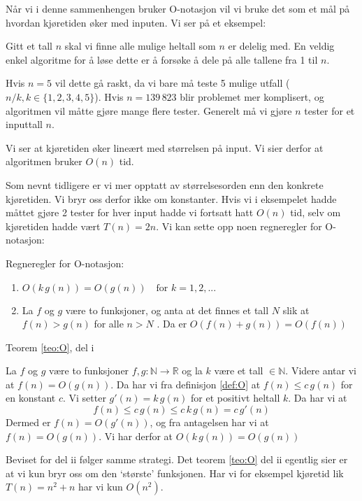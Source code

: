 Når vi i denne sammenhengen bruker O-notasjon vil vi bruke det som et mål på hvordan kjøretiden øker med inputen. Vi ser på et eksempel:

\begin{eks}
Gitt et tall $ n $ skal vi finne alle mulige heltall som $ n $ er delelig med. En veldig enkel algoritme for å løse dette er å forsøke å dele på alle tallene fra 1 til $ n $. 

Hvis $ n=5 $ vil dette gå raskt, da vi bare må teste 5 mulige utfall ($ n/k, k \in \{1, 2, 3, 4, 5\} $). Hvis $ n=139\,823 $ blir problemet mer komplisert, og algoritmen vil måtte gjøre mange flere tester. Generelt må vi gjøre $ n $ tester for et inputtall $ n $.

Vi ser at kjøretiden øker lineært med størrelsen på input. Vi sier derfor at algoritmen bruker $ O(n) $ tid.
\end{eks}

Som nevnt tidligere er vi mer opptatt av størrelsesorden enn den konkrete kjøretiden. Vi bryr oss derfor ikke om konstanter. Hvis vi i eksempelet hadde måttet gjøre 2 tester for hver input hadde vi fortsatt hatt $ O(n) $ tid, selv om kjøretiden hadde vært $ T(n) = 2n $. Vi kan sette opp noen regneregler for O-notasjon:
\begin{teorem}
\label{teo:O}
Regneregler for O-notasjon:
\begin{enumerate}[i]
\item $ O(k\,g(n)) = O(g(n)) \quad \text{for } k = 1,2,... $
\item La $ f $ og $ g $ være to funksjoner, og anta at det finnes et tall $ N $ slik at $ f(n) > g(n) $ for alle $ n > N$ . Da er $ O(f(n)+g(n)) = O(f(n)) $
\end{enumerate}
\end{teorem}

\begin{bevis} Teorem \ref{teo:O}, del i

La $ f $ og $ g $ være to funksjoner $ f,g:\mathbb{N}\rightarrow\mathbb{R} $ og la $ k $ være et tall $ \in \mathbb{N} $. Videre antar vi at $ f(n) = O(g(n)) $. Da har vi fra definisjon \ref{def:O} at $ f(n) \leq c\,g(n) $ for en konstant $ c $. Vi setter $ g'(n) = k\,g(n) $ for et positivt heltall $ k $. Da har vi at
\[ f(n) \leq c\,g(n) \leq c\,k\,g(n) = c\,g'(n) \]
Dermed er $ f(n) = O(g'(n)) $, og fra antagelsen har vi at $ f(n) = O(g(n)) $. Vi har derfor at $ O(k\,g(n)) = O(g(n)) $
\end{bevis}

Beviset for del ii følger samme strategi. Det teorem \ref{teo:O} del ii egentlig sier er at vi kun bryr oss om den `største' funksjonen. Har vi for eksempel kjøretid lik $ T(n) = n^2 + n $ har vi kun $ O(n^2) $.

